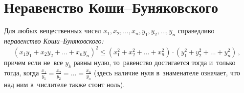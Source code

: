 
\section*{Неравенство Коши--Буняковского}


Для любых вещественных чисел
$x_1, x_2, \ldots, x_n, y_1, y_2, \ldots, y_n$ справедливо
\emph{неравенство Коши--Буня\-ковс\-кого:}
\[
    (x_1 y_1 + x_2 y_2 + \ldots + x_n y_n)^2
\leq
    (x_1^2 + x_2^2 + \ldots + x_n^2) \cdot
    (y_1^2 + y_2^2 + \ldots + y_n^2)
\, , \]
причем если не~все $y_k$ равны нулю, то~равенство достигается тогда и~только
тогда, когда
\(
    \frac{x_1}{y_1} = \frac{x_2}{y_2} = \ldots = \frac{x_n}{y_n}
\)
(здесь наличие нуля в~знаменателе означает, что над ним в~числителе также
стоит ноль).

